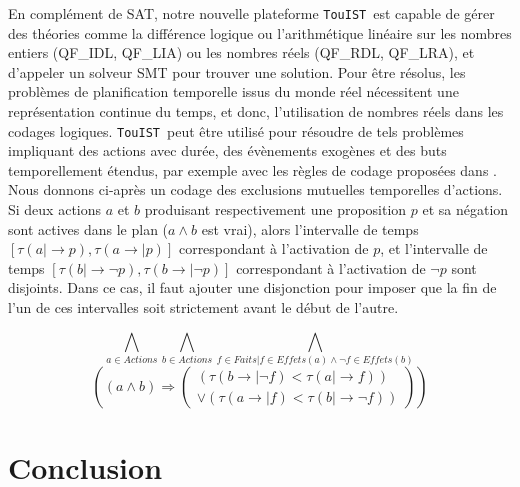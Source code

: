 \documentclass{iaf}
\newcommand{\NOT}[0]{\neg}
\newcommand{\nameTool}{{\sc \texttt {TouIST}}}
\begin{document}
En compl\'ement de SAT, notre nouvelle plateforme \nameTool\ est capable de g\'erer des th\'eories comme la diff\'erence logique ou l'arithm\'etique lin\'eaire sur les nombres entiers (QF\_IDL, QF\_LIA) ou les nombres r\'eels (QF\_RDL, QF\_LRA), et d'appeler un solveur SMT pour trouver une solution. Pour \^etre r\'esolus, les probl\`emes de planification temporelle issus du monde r\'eel n\'ecessitent une repr\'esentation continue du temps, et donc, l'utilisation de nombres r\'eels dans les codages logiques. \nameTool\ peut \^etre utilis\'e pour r\'esoudre de tels probl\`emes impliquant des actions avec dur\'ee, des \'ev\`enements exog\`enes et des buts temporellement \'etendus, par exemple avec les r\`egles de codage propos\'ees dans \cite{MarisRegnier08}. Nous donnons ci-apr\`es un codage des exclusions mutuelles temporelles d'actions. Si deux actions $a$ et $b$ produisant respectivement une proposition $p$ et sa n\'egation sont actives dans le plan ($a \wedge b$ est vrai), alors l'intervalle de temps $[\tau(a \mid\rightarrow p), \tau(a \rightarrow\mid p)]$ correspondant \`a l'activation de $p$, et l'intervalle de temps $[\tau(b \mid\rightarrow \lnot p), \tau(b \rightarrow\mid \lnot p)]$ correspondant \`a l'activation de $\NOT p$ sont disjoints. Dans ce cas, il faut ajouter une disjonction pour imposer que la fin de l'un de ces intervalles soit strictement avant le d\'ebut de l'autre.

  \[\bigwedge_{a\in Actions}
  \bigwedge_{b\in Actions}
  \bigwedge_{f\in Faits | f\in Effets(a) \wedge \lnot f\in Effets(b)}\]
  \[\left(\left(a \wedge b\right) \Rightarrow 
  \left( \begin{aligned} \left(\tau(b \rightarrow\mid \lnot f) < \tau(a \mid\rightarrow f)\right)
    \\ \vee
    \left(\tau(a \rightarrow\mid f) < \tau(b \mid\rightarrow \lnot f)\right)
 \end{aligned} \right)\right) \]







\section{Conclusion}\label{sec:evaluation}
\end{document}
